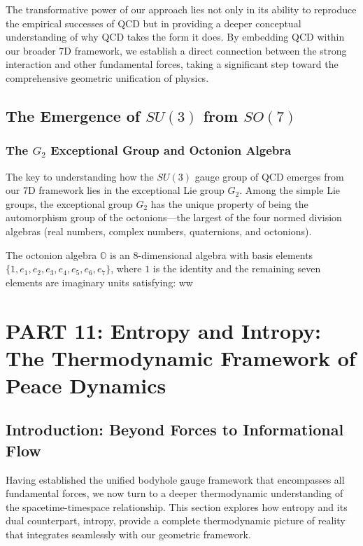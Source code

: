 \documentclass{article}
\begin{document}
The transformative power of our approach lies not only in its ability to reproduce the empirical successes of QCD but in providing a deeper conceptual understanding of why QCD takes the form it does. By embedding QCD within our broader 7D framework, we establish a direct connection between the strong interaction and other fundamental forces, taking a significant step toward the comprehensive geometric unification of physics.

\subsection{The Emergence of $SU(3)$ from $SO(7)$}

\subsubsection{The $G_2$ Exceptional Group and Octonion Algebra}

The key to understanding how the $SU(3)$ gauge group of QCD emerges from our 7D framework lies in the exceptional Lie group $G_2$. Among the simple Lie groups, the exceptional group $G_2$ has the unique property of being the automorphism group of the octonions—the largest of the four normed division algebras (real numbers, complex numbers, quaternions, and octonions).

The octonion algebra $\mathbb{O}$ is an 8-dimensional algebra with basis elements $\{1, e_1, e_2, e_3, e_4, e_5, e_6, e_7\}$, where $1$ is the identity and the remaining seven elements are imaginary units satisfying:
ww




\section{PART 11: Entropy and Intropy: The Thermodynamic Framework of Peace Dynamics}

\subsection{Introduction: Beyond Forces to Informational Flow}

Having established the unified bodyhole gauge framework that encompasses all fundamental forces, we now turn to a deeper thermodynamic understanding of the spacetime-timespace relationship. This section explores how entropy and its dual counterpart, intropy, provide a complete thermodynamic picture of reality that integrates seamlessly with our geometric framework.
\end{document}
